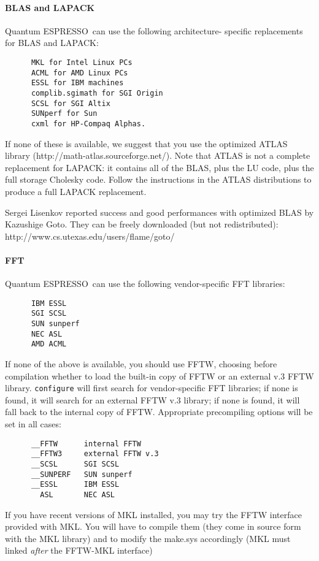 \documentclass[12pt,a4paper]{article}
\def\qe{{\sc Quantum ESPRESSO}}
\begin{document}
\paragraph{BLAS and LAPACK} 
\qe\ can use the following architecture-
specific replacements for BLAS and LAPACK:
\begin{verbatim}
      MKL for Intel Linux PCs
      ACML for AMD Linux PCs
      ESSL for IBM machines
      complib.sgimath for SGI Origin
      SCSL for SGI Altix
      SUNperf for Sun
      cxml for HP-Compaq Alphas.
\end{verbatim}
If none of these is available, we suggest that you use the optimized ATLAS
library (http://math-atlas.sourceforge.net/). Note that ATLAS is not
a complete replacement for LAPACK: it contains all of the BLAS, plus the
LU code, plus the full storage Cholesky code. Follow the instructions in the
ATLAS distributions to produce a full LAPACK replacement.
    
Sergei Lisenkov reported success and good performances with optimized
BLAS by Kazushige Goto. They can be freely downloaded  (but not redistributed):
http://www.cs.utexas.edu/users/flame/goto/

\paragraph{FFT}
\qe\ can use the following vendor-specific FFT libraries:
\begin{verbatim}
      IBM ESSL
      SGI SCSL
      SUN sunperf
      NEC ASL
      AMD ACML
\end{verbatim}
If none of the above is available, you should use FFTW, choosing
before compilation whether to load the built-in copy of FFTW 
or an external v.3 FFTW library.
\texttt{configure} will first search for vendor-specific FFT libraries;
if none is found, it will search for an external FFTW v.3 library;
if none is found, it will fall back to the internal  copy of FFTW.
Appropriate precompiling options will be set in all cases:
\begin{verbatim}
      __FFTW      internal FFTW
      __FFTW3     external FFTW v.3
      __SCSL      SGI SCSL
      __SUNPERF   SUN sunperf 
      __ESSL      IBM ESSL
        ASL       NEC ASL
\end{verbatim}
If you have recent versions of MKL installed, you may try the 
FFTW interface provided with MKL. You will have to compile them
(they come in source form with the MKL library)
and to modify the make.sys accordingly (MKL must linked {\em after}
the FFTW-MKL interface)
\end{document}
